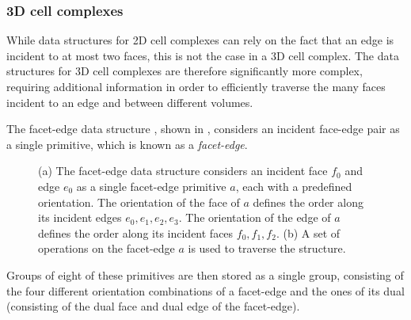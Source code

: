 \subsubsection{3D cell complexes}

While data structures for 2D cell complexes can rely on the fact that an edge is incident to at most two faces, this is not the case in a 3D cell complex.
The data structures for 3D cell complexes are therefore significantly more complex, requiring additional information in order to efficiently traverse the many faces incident to an edge and between different volumes.

The facet-edge data structure \citep{Dobkin87}, shown in , considers an incident face-edge pair as a single primitive, which is known as a \emph{facet-edge}.
\begin{figure}[b]
\centering
{}
\quad
{}
\caption[The facet-edge data structure]{(a) The facet-edge data structure considers an incident face $f_0$ and edge $e_0$ as a single facet-edge primitive $a$, each with a predefined orientation. The orientation of the face of $a$ defines the order along its incident edges $e_0,e_1,e_2,e_3$. The orientation of the edge of $a$ defines the order along its incident faces $f_0,f_1,f_2$. (b) A set of operations on the facet-edge $a$ is used to traverse the structure.}
\label{fig:facet-edge}
\end{figure}
Groups of eight of these primitives are then stored as a single group, consisting of the four different orientation combinations of a facet-edge and the ones of its dual (consisting of the dual face and dual edge of the facet-edge).

